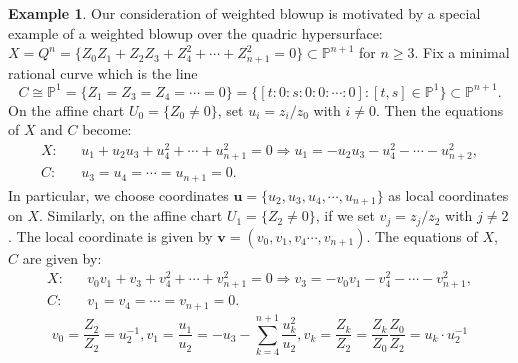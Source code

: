 \documentclass[12pt]{amsart}
\theoremstyle{definition}
\newtheorem{ex}[thm]{Example}
\def\Bv{\mathbf{v}}
\newcommand{\IC}{{\mathbb C}}
\newcommand{\IP}{{\mathbb P}}
\begin{document}
\begin{ex}\label{ex-quadric}
    Our consideration of weighted blowup is motivated by a special example of a weighted blowup over the quadric hypersurface: 
    $X=Q^n=\{Z_0Z_1+Z_2Z_3+Z_4^2+\cdots+Z_{n+1}^2=0\}\subset \IP^{n+1}$ for $n\ge 3$. %
    Fix a minimal rational curve which is the line $$C\cong \IP^1=\{Z_1=Z_3=Z_4=\cdots=0\}=\{[t:0:s:0:0:\cdots: 0]\colon [t,s]\in \IP^1\}\subset \IP^{n+1}.$$ %
    On the affine chart $U_0=\{Z_0\neq 0\}$, set
    $u_i=z_i /z_0$ with $i\neq 0$. Then the equations of $X$ and $C$ become:
    \begin{eqnarray*}
        X: && u_1+u_2u_3+u_4^2+\cdots+u_{n+1}^2=0\Longrightarrow u_1=-u_2u_3-u_4^2-\cdots-u_{n+2}^2,\\
        C: && u_3=u_4=\cdots=u_{n+1}=0.
    \end{eqnarray*}
   In particular, we choose coordinates $\mathbf{u}=\{u_2, u_3, u_4, \cdots, u_{n+1}\}$ as local coordinates on $X$.   
    Similarly, on the affine chart $U_1=\{Z_2\neq 0\}$, if we set $v_j=z_j/z_2$ with $j\neq 2$. The local coordinate is given by $\Bv=(v_0,v_1,v_4\cdots,v_{n+1})$. The equations of $X$, $C$ 
    are given by:
    \begin{eqnarray*}
        X: && v_0v_1+v_3+v_4^2+\cdots+ v_{n+1}^2=0\Longrightarrow v_3=-v_0v_1-v_4^2-\cdots-v_{n+1}^2,\\
        C: && v_1=v_4=\cdots=v_{n+1}=0. %
    \end{eqnarray*}
    \begin{equation*}
        v_0=\frac{Z_2}{Z_2}=u_2^{-1}, 
        v_1=\frac{u_1}{u_2}=-u_3-\sum_{k=4}^{n+1}\frac{u_k^2}{u_2}, v_k=\frac{Z_k}{Z_2}=\frac{Z_k}{Z_0}\frac{Z_0}{Z_2}=u_k\cdot u_2^{-1}
    \end{equation*}


\end{ex}
\end{document}
